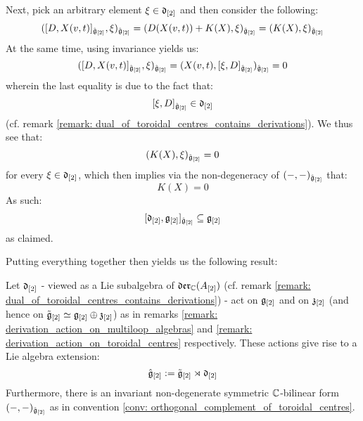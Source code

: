 \begin{remark}
                Next, pick an arbitrary element $\xi \in \mathfrak{d}_{[2]}$ and then consider the following:
                    $$( [ D, X(v, t) ]_{\hat{\mathfrak{g}}_{[2]}}, \xi )_{\hat{\mathfrak{g}}_{[2]}} = (D( X(v, t) ) + K(X), \xi)_{\hat{\mathfrak{g}}_{[2]}} = (K(X), \xi)_{\hat{\mathfrak{g}}_{[2]}}$$
                At the same time, using invariance yields us:
                    $$( [ D, X(v, t) ]_{\hat{\mathfrak{g}}_{[2]}}, \xi )_{\hat{\mathfrak{g}}_{[2]}} = (X(v, t), [\xi, D]_{\hat{\mathfrak{g}}_{[2]}})_{\hat{\mathfrak{g}}_{[2]}} = 0$$
                wherein the last equality is due to the fact that:
                    $$[\xi, D]_{\hat{\mathfrak{g}}_{[2]}} \in \mathfrak{d}_{[2]}$$
                (cf. remark \ref{remark: dual_of_toroidal_centres_contains_derivations}). We thus see that:
                    $$(K(X), \xi)_{\hat{\mathfrak{g}}_{[2]}} = 0$$
                for every $\xi \in \mathfrak{d}_{[2]}$, which then implies via the non-degeneracy of $(-, -)_{\hat{\mathfrak{g}}_{[2]}}$ that:
                    $$K(X) = 0$$
                As such:
                    $$[ \mathfrak{d}_{[2]}, \mathfrak{g}_{[2]} ]_{\hat{\mathfrak{g}}_{[2]}} \subseteq \mathfrak{g}_{[2]}$$
                as claimed. 
            \end{remark}

            Putting everything together then yields us the following result:
            \begin{proposition} \label{prop: extended_toroidal_lie_algebras}
                Let $\mathfrak{d}_{[2]}$ - viewed as a Lie subalgebra of $\mathfrak{der}_{\mathbb{C}}(A_{[2]})$ (cf. remark \ref{remark: dual_of_toroidal_centres_contains_derivations}) - act on $\mathfrak{g}_{[2]}$ and on $\mathfrak{z}_{[2]}$ (and hence on $\tilde{\mathfrak{g}}_{[2]}\simeq \mathfrak{g}_{[2]} \oplus \mathfrak{z}_{[2]}$) as in remarks \ref{remark: derivation_action_on_multiloop_algebras} and \ref{remark: derivation_action_on_toroidal_centres} respectively. These actions give rise to a Lie algebra extension:
                    $$\hat{\mathfrak{g}}_{[2]} := \tilde{\mathfrak{g}}_{[2]}\rtimes \mathfrak{d}_{[2]}$$
                Furthermore, there is an invariant non-degenerate symmetric $\mathbb{C}$-bilinear form $(-, -)_{\hat{\mathfrak{g}}_{[2]}}$ as in convention \ref{conv: orthogonal_complement_of_toroidal_centres}. 
            \end{proposition}

